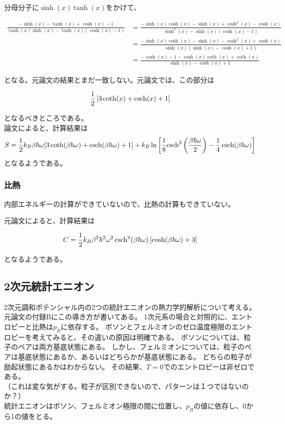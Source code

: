 \documentclass[a4paper,11pt]{jsarticle}
\numberwithin{equation}{section}
\begin{document}
分母分子に$\sinh(x)\tanh(x)$をかけて、

\begin{align}
  \frac{-\sinh(x)-\tanh(x)+\cosh(x)-1}{\tanh(x)\sinh(x)-\tanh(x)(\cosh(x)-1)}
  &= \frac{-\sinh(x)\cosh(x)-\sinh(x)+\cosh^2(x)-\cosh(x)}{\sinh^2(x)-\sinh(x)(\cosh(x)-1)}\\
  &= \frac{-\sinh(x)\cosh(x)-\sinh(x)-\cosh^2(x)+\cosh(x)}{\sinh(x)(\sinh(x)-\cosh(x)+1)}\\
  &= \frac{-\cosh(x)-1-\cosh(x)\coth(x)+\coth(x)}{\sinh(x)-\cosh(x)+1}
\end{align}

となる。元論文の結果とまだ一致しない。元論文では、この部分は

\begin{align}
  \frac{1}{2}\left[3\coth(x)+\csch(x)+1\right]
\end{align}

となるべきところである。\\
論文によると、計算結果は
\begin{align}
  S=\frac{1}{2}k_B\beta\hbar\omega[3\coth(\beta\hbar\omega)+\csch(\beta\hbar\omega)+1]+k_B\ln\left[\frac{1}{8}{\csch}^2\left(\frac{\beta\hbar\omega}{2}\right)-\frac{1}{4}\csch(\beta\hbar\omega)\right]
\end{align}
となるようである。

\subsubsection{比熱}
内部エネルギーの計算ができていないので、比熱の計算もできていない。

元論文によると、計算結果は

\begin{align}
C=\frac{1}{2}k_B \beta^2 \hbar^2 \omega^2 \csch^2(\beta\hbar\omega)\left[\cosh(\beta\hbar\omega)+3\right]
\end{align}

となるようである。

\subsection{2次元統計エニオン}
2次元調和ポテンシャル内の2つの統計エニオンの熱力学的解析について考える。
元論文の付録Bにこの導き方が書いてある。
1次元系の場合と対照的に、エントロピーと比熱は$p_B$に依存する。
ボソンとフェルミオンのゼロ温度極限のエントロピーを考えてみると、その違いの原因は明確である。
ボソンについては、粒子のペアは両方基底状態にある。
しかし、フェルミオンについては、粒子のペアは基底状態にあるか、あるいはどちらかが基底状態にある。
どちらの粒子が励起状態にあるかはわからない。
その結果、$T=0$でのエントロピーは非ゼロである。\\
（これは変な気がする。粒子が区別できないので、パターンは１つではないのか？）\\
統計エニオンはボソン、フェルミオン極限の間に位置し、$p_B$の値に依存し、0から1の値をとる。
\end{document}
